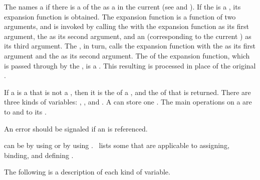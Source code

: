 The  names a  
if there is a  of the  as a 
in the current  
 (see  and ).
If the  is a ,
its expansion function is obtained.
The expansion function is a function of two arguments, and is invoked
by calling the  with 
     the expansion function as its first argument,
     the  as its second argument,
 and an  (corresponding to the current )
      as its third argument.
The , in turn, calls the expansion function with the
 as its first argument and the  as its second argument.
The  of the expansion function, which is passed through
by the , is a . 
This resulting  is processed in place of the original .

If a  is a  that is not a ,
then it is the  of a , and the  of that
 is returned. There are three kinds of variables:
 ,
 ,
and
 .
A  can store one .
The main operations on a  are 
 to  and 
 to 
its .


An error  should be signaled if
an  is referenced.

 can be  by using  
or  by using .
\Thenextfigure\ lists some  that
are applicable to assigning, binding, and defining .


The following is a description of each kind of variable.


